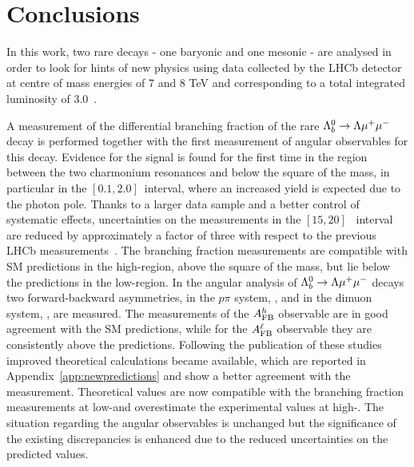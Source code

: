 \chapter{Conclusions}
\label{sec:conclusions}

In this work, two rare decays - one baryonic and one mesonic - are analysed in order to look for hints of new physics using data collected by the LHCb 
detector at centre of mass energies of 7 and 8 TeV and corresponding to a total integrated luminosity of 3.0~\invfb.

A measurement of the differential branching fraction of the rare $\Lambda^0_b\rightarrow\Lambda\mu^+\mu^-$ decay is performed together
with the first measurement of angular observables for this decay.
Evidence for the signal is found for the first time in the \qsq region between the two charmonium resonances and 
below the square of the \jpsi mass, in particular in the $[0.1,2.0]$~\gevgevcccc interval, 
where an increased yield is expected due to the photon pole. 
Thanks to a larger data sample and a better control of systematic effects, uncertainties on the measurements in the $[15,20]$~\gevgevcccc
interval are reduced by approximately a factor of three with respect to the previous LHCb measurements~\cite{LHCb-PAPER-2013-025}. 
The branching fraction measurements are compatible with SM predictions in the high-\qsq region, above the square
 of the \jpsi mass, but lie below the predictions in the low-\qsq region. In the angular analysis of $\Lambda^0_b\rightarrow\Lambda\mu^+\mu^-$ decays
 two forward-backward asymmetries, in the $p\pi$ system, \afbh, and in the dimuon system, \afbl, are measured. 
 The measurements of the $A_{\rm FB}^h$ observable are in good agreement with the SM predictions, while for the $A_{\rm FB}^\ell$ observable
 they are consistently above the predictions. Following the publication of these studies improved theoretical calculations 
 became available, which are reported in Appendix~\ref{app:newpredictions} and show a better agreement with the measurement. 
 Theoretical values are now compatible with the branching fraction measurements at low-\qsq and overestimate the experimental 
 values at high-\qsq. The situation regarding the angular observables is unchanged but the 
 significance of the existing discrepancies is enhanced due to the reduced uncertainties on the predicted values.
 
